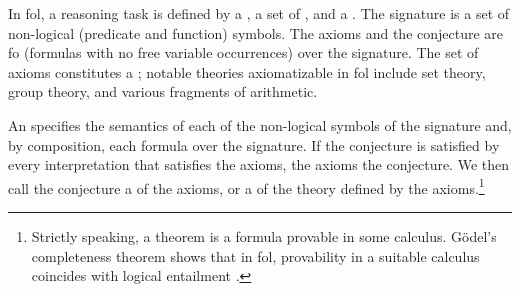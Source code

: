 In \gls{fol}, a reasoning task is defined by a , a set of , and a .
The signature is a set of non-logical (predicate and function) symbols.
The axioms and the conjecture are \gls{fo}  (formulas with no free variable occurrences) over the signature.
The set of axioms constitutes a ;
notable theories axiomatizable in \gls{fol} include set theory, group theory, and various fragments of arithmetic.

An  specifies the semantics of each of the non-logical symbols of the signature and, by composition, each formula over the signature.
If the conjecture is satisfied by every interpretation that satisfies the axioms,
the axioms  the conjecture.
We then call the conjecture
a  of the axioms,
or a  of the theory defined by the axioms.\footnote{Strictly speaking, a theorem is a formula provable in some calculus.
Gödel's completeness theorem shows that in \gls{fol},
provability in a suitable calculus coincides with logical entailment \cite{DBLP:books/daglib/0072413}.}


